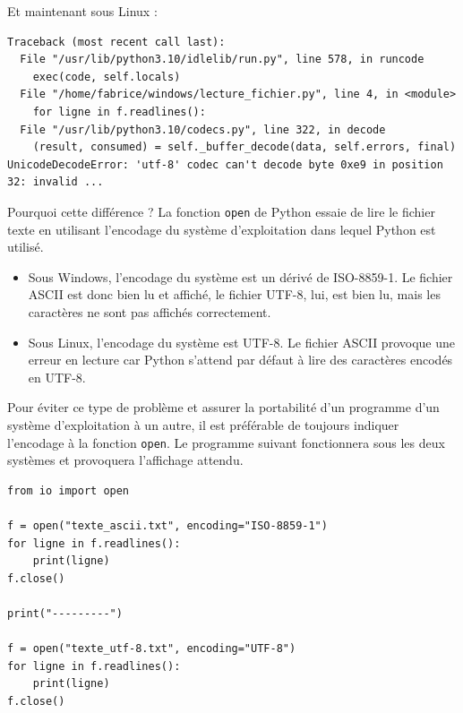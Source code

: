 \documentclass[11pt,a4paper]{article}
\providecommand{\tightlist}{\setlength{\itemsep}{0pt}\setlength{\parskip}{0pt}}
\begin{document}
Et maintenant sous Linux :

\begin{center}
\begin{minipage}{18cm}
\begin{verbatim}
Traceback (most recent call last):
  File "/usr/lib/python3.10/idlelib/run.py", line 578, in runcode
    exec(code, self.locals)
  File "/home/fabrice/windows/lecture_fichier.py", line 4, in <module>
    for ligne in f.readlines():
  File "/usr/lib/python3.10/codecs.py", line 322, in decode
    (result, consumed) = self._buffer_decode(data, self.errors, final)
UnicodeDecodeError: 'utf-8' codec can't decode byte 0xe9 in position 32: invalid ...
\end{verbatim}
\end{minipage}
\end{center}

Pourquoi cette différence ? La fonction \texttt{open} de Python essaie
de lire le fichier texte en utilisant l'encodage du système
d'exploitation dans lequel Python est utilisé.

\begin{itemize}
\tightlist
\item
  Sous Windows, l'encodage du système est un dérivé de ISO-8859-1. Le
  fichier ASCII est donc bien lu et affiché, le fichier UTF-8, lui, est
  bien lu, mais les caractères ne sont pas affichés correctement.
\item
  Sous Linux, l'encodage du système est UTF-8. Le fichier ASCII provoque
  une erreur en lecture car Python s'attend par défaut à lire des
  caractères encodés en UTF-8.
\end{itemize}

Pour éviter ce type de problème et assurer la portabilité d'un programme
d'un système d'exploitation à un autre, il est préférable de toujours
indiquer l'encodage à la fonction \texttt{open}. Le programme suivant
fonctionnera sous les deux systèmes et provoquera l'affichage attendu.

\begin{center}
\begin{minipage}{11cm}
\begin{verbatim}
from io import open

f = open("texte_ascii.txt", encoding="ISO-8859-1")
for ligne in f.readlines():
    print(ligne)
f.close()

print("---------")

f = open("texte_utf-8.txt", encoding="UTF-8")
for ligne in f.readlines():
    print(ligne)
f.close()
\end{verbatim}
\end{minipage}
\end{center}
\end{document}
